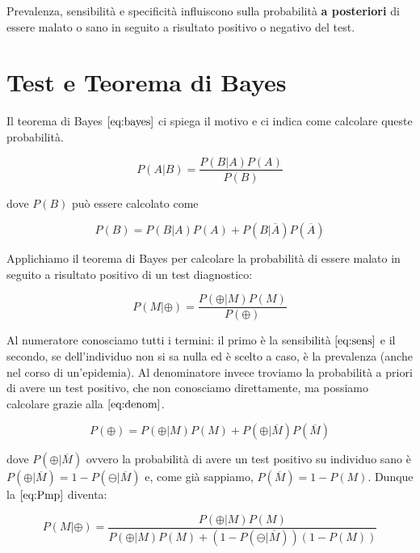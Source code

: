 \documentclass[11pt]{article}
\begin{document}
Prevalenza, sensibilità e specificità influiscono sulla probabilità
\textbf{a posteriori} di essere malato o sano in seguito a risultato
positivo o negativo del test.

\hypertarget{test-e-teorema-di-bayes}{%
\section{Test e Teorema di Bayes}\label{test-e-teorema-di-bayes}}

Il teorema di Bayes \(\eqref{eq:bayes}\) ci spiega il motivo e ci indica
come calcolare queste probabilità.

\begin{equation}\label{eq:bayes}
P(A|B) = \frac{P(B|A)P(A)}{P(B)}
\end{equation}

dove \(P(B)\) può essere calcolato come

\begin{equation}\label{eq:denom}
P(B) = P(B|A)P(A) + P(B|\overline{A})P(\overline{A})
\end{equation}

Applichiamo il teorema di Bayes per calcolare la probabilità di essere
malato in seguito a risultato positivo di un test diagnostico:

\begin{equation}\label{eq:Pmp}
P(M|\oplus) = \frac{P(\oplus|M)P(M)}{P(\oplus)}
\end{equation}

Al numeratore conosciamo tutti i termini: il primo è la sensibilità
\(\eqref{eq:sens}\) e il secondo, se dell'individuo non si sa nulla ed è
scelto a caso, è la prevalenza (anche nel corso di un'epidemia). Al
denominatore invece troviamo la probabilità a priori di avere un test
positivo, che non conosciamo direttamente, ma possiamo calcolare grazie
alla \(\eqref{eq:denom}\).

\begin{equation}\label{eq:Pp}
P(\oplus) = P(\oplus|M)P(M) + P(\oplus|\overline{M})P(\overline{M})
\end{equation}

dove \(P(\oplus|\overline{M})\) ovvero la probabilità di avere un test
positivo su individuo sano è
\(P(\oplus|\overline{M}) = 1 - P(\ominus|\overline{M})\) e, come già
sappiamo, \(P(\overline{M}) = 1 - P(M)\). Dunque la \(\eqref{eq:Pmp}\)
diventa:

\begin{equation}\label{eq:Pmp2}
P(M|\oplus) = \frac{P(\oplus|M)P(M)}{P(\oplus|M)P(M) + (1 - P(\ominus|\overline{M}))(1 - P(M))}
\end{equation}
\end{document}
